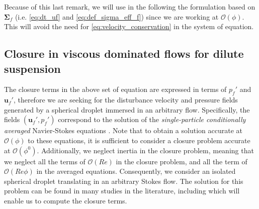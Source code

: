 Because of this last remark, we will use in the following the formulation based on $\bm\Sigma_f$ (i.e. \ref{eq:dt_uf} and \ref{eq:def_sigma_eff_f}) since we are working at $\mathcal{O}(\phi)$.
This will avoid the need for \ref{eq:velocity_conservation} in the system of equation. 




\subsection{Closure in viscous dominated flows for dilute suspension}

The closure terms in the above set of equation are expressed in terms of $p_f'$ and $\textbf{u}_f'$, therefore we are seeking for the disturbance velocity and pressure fields generated by a spherical droplet immersed in an arbitrary flow. 
Specifically, the fields $(\textbf{u}_f',p_f')$ correspond to the solution of the 
 \textit{single-particle conditionally averaged} Navier-Stokes equations \citep{hinch1977averaged,zhang1994averaged} . 
Note that to obtain a solution accurate at $\mathcal{O}(\phi)$ to these equations, it is sufficient to consider a closure problem accurate at $\mathcal{O}(\phi^0)$\citep{hinch1977averaged,zhang1994averaged}.
Additionally, we neglect inertia in the closure problem, meaning that we neglect all the terms of $\mathcal{O}(Re)$ in the closure problem, and all the term of $\mathcal{O}(Re\phi)$ in the averaged equations. 
Consequently, we consider an isolated spherical droplet translating in an arbitrary Stokes flow.
The solution for this problem can be found in many studies in the literature, including \citet{leal2007advanced,pozrikidis1992boundary,kim2013microhydrodynamics,pozrikidis2011introduction,nadim1991motion} which will enable us to compute the closure terms.

